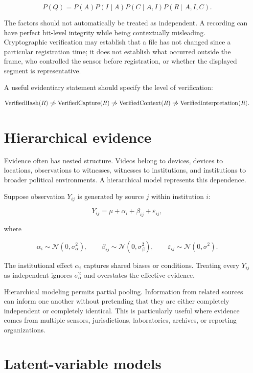 \[
P(Q)
=
P(A)
P(I\mid A)
P(C\mid A,I)
P(R\mid A,I,C).
\]

The factors should not automatically be treated as independent. A recording can have perfect bit-level integrity while being contextually misleading. Cryptographic verification may establish that a file has not changed since a particular registration time; it does not establish what occurred outside the frame, who controlled the sensor before registration, or whether the displayed segment is representative.

A useful evidentiary statement should specify the level of verification:

\[
\operatorname{VerifiedHash}(R)
\centernot\Rightarrow
\operatorname{VerifiedCapture}(R)
\centernot\Rightarrow
\operatorname{VerifiedContext}(R)
\centernot\Rightarrow
\operatorname{VerifiedInterpretation}(R).
\]

\section{Hierarchical evidence}
\label{sec:a38}

Evidence often has nested structure. Videos belong to devices, devices to locations, observations to witnesses, witnesses to institutions, and institutions to broader political environments. A hierarchical model represents this dependence.

Suppose observation \(Y_{ij}\) is generated by source \(j\) within institution \(i\):

\[
Y_{ij}
=
\mu+\alpha_i+\beta_{ij}+\varepsilon_{ij},
\]

where

\[
\alpha_i\sim\mathcal N(0,\sigma_\alpha^2),
\qquad
\beta_{ij}\sim\mathcal N(0,\sigma_\beta^2),
\qquad
\varepsilon_{ij}\sim\mathcal N(0,\sigma^2).
\]

The institutional effect \(\alpha_i\) captures shared biases or conditions. Treating every \(Y_{ij}\) as independent ignores \(\sigma_\alpha^2\) and overstates the effective evidence.

Hierarchical modeling permits partial pooling. Information from related sources can inform one another without pretending that they are either completely independent or completely identical. This is particularly useful where evidence comes from multiple sensors, jurisdictions, laboratories, archives, or reporting organizations.

\section{Latent-variable models}
\label{sec:a39}

